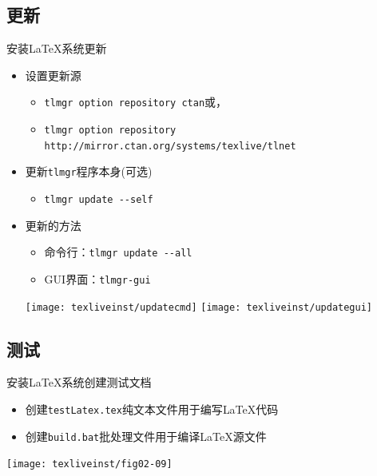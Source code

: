 \documentclass[xcolor=svgnames, t]{ctexbeamer}
\begin{document}
\subsection[更新]{更新\TeXLive }
\begin{frame}[t,fragile]{安装\LaTeX 系统}{更新\TeXLive}
  \stretchon
  \begin{itemize}
  \item 设置更新源
    \begin{itemize}
    \item \texttt{tlmgr option repository ctan}或，%
    \item \texttt{tlmgr option repository http://mirror.ctan.org/systems/texlive/tlnet}%
    \end{itemize}
  \item 更新{\verb|tlmgr|}程序本身(可选)
    \begin{itemize}
    \item {\verb|tlmgr update --self|}%
    \end{itemize}
  \item 更新\TeXLive 的方法
    \begin{itemize}
    \item 命令行：{\verb|tlmgr update --all|}%
    \item GUI界面：{\verb|tlmgr-gui|}%
    \end{itemize}
    \stretchoff
    \begin{center}
      \texttt{[image: texliveinst/updatecmd]}\quad
      \texttt{[image: texliveinst/updategui]}
    \end{center}
  \end{itemize}
\end{frame}

\subsection[测试]{测试\TeXLive }
\begin{frame}{安装\LaTeX 系统}{创建\tex 测试文档}
  \stretchon
  \begin{itemize}
  \item 创建\texttt{testLatex.tex}纯文本文件用于编写{\LaTeX}代码
  \item 创建\texttt{build.bat}批处理文件用于编译{\LaTeX}源文件
  \end{itemize}
  
  \centering%
  \texttt{[image: texliveinst/fig02-09]}
  \stretchoff
\end{frame}
\end{document}
